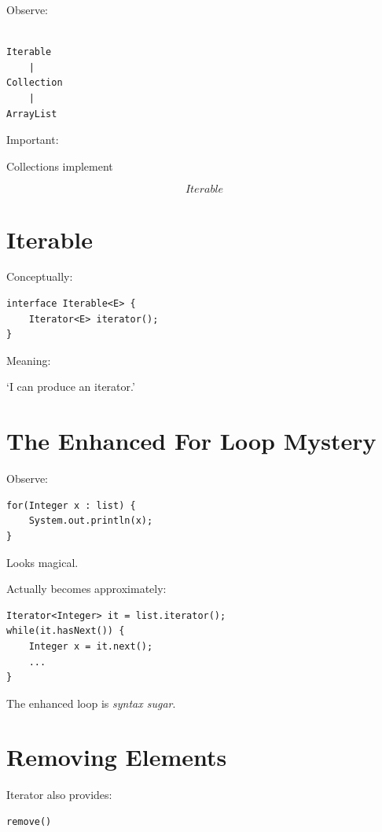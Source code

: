 \documentclass[11pt,a4paper]{book}
\begin{document}
Observe:

\begin{verbatim}

Iterable
    |
Collection
    |
ArrayList

\end{verbatim}

Important:

Collections implement

\[
Iterable
\]

\section{Iterable}

Conceptually:

\begin{verbatim} 
interface Iterable<E> {
    Iterator<E> iterator();
}
\end{verbatim}

Meaning:

`I can produce an iterator.'

\section{The Enhanced For Loop Mystery}

Observe:

\begin{verbatim} 
for(Integer x : list) {
    System.out.println(x);
}
\end{verbatim}

Looks magical.

Actually becomes approximately:

\begin{verbatim} 
Iterator<Integer> it = list.iterator();
while(it.hasNext()) {
    Integer x = it.next();
    ...
}
\end{verbatim}


The enhanced loop is \textcolor{RosettaRoyalPurple}{\emph{syntax sugar}}.

\section{Removing Elements}

Iterator also provides:

\begin{verbatim} 
remove()
\end{verbatim}
\end{document}
